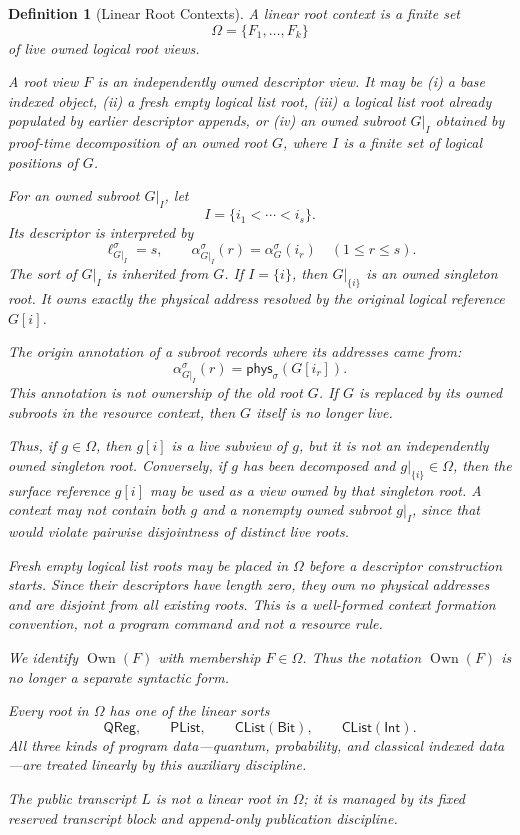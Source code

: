 \documentclass[acmsmall,screen,review,anonymous,nonacm]{acmart}
\newtheorem{definition}{Definition}[section]
\theoremstyle{defn_style}
\begin{document}
\begin{definition}[Linear Root Contexts]
A linear root context is a finite set
\[
\Omega=\{F_1,\ldots,F_k\}
\]
of live owned logical root views.

A root view \(F\) is an independently owned descriptor view. It may be
(i) a base indexed object,
(ii) a fresh empty logical list root,
(iii) a logical list root already populated by earlier descriptor appends, or
(iv) an owned subroot \(G|_I\) obtained by proof-time decomposition of an
owned root \(G\), where \(I\) is a finite set of logical positions of \(G\).

For an owned subroot \(G|_I\), let
\[
I=\{i_1<\cdots<i_s\}.
\]
Its descriptor is interpreted by
\[
\ell_{G|_I}^\sigma=s,
\qquad
\alpha_{G|_I}^\sigma(r)=\alpha_G^\sigma(i_r)
\quad(1\le r\le s).
\]
The sort of \(G|_I\) is inherited from \(G\). If \(I=\{i\}\), then
\(G|_{\{i\}}\) is an owned singleton root. It owns exactly the physical address
resolved by the original logical reference \(G[i]\).

The origin annotation of a subroot records where its addresses came from:
\[
\alpha_{G|_I}^\sigma(r)=\mathsf{phys}_\sigma(G[i_r]).
\]
This annotation is not ownership of the old root \(G\). If \(G\) is replaced by
its owned subroots in the resource context, then \(G\) itself is no longer live.

Thus, if \(g\in\Omega\), then \(g[i]\) is a live subview of \(g\), but it is
not an independently owned singleton root. Conversely, if \(g\) has been
decomposed and \(g|_{\{i\}}\in\Omega\), then the surface reference \(g[i]\)
may be used as a view owned by that singleton root. A context may not contain
both \(g\) and a nonempty owned subroot \(g|_I\), since that would violate
pairwise disjointness of distinct live roots.

Fresh empty logical list roots may be placed in \(\Omega\) before a descriptor
construction starts. Since their descriptors have length zero, they own no
physical addresses and are disjoint from all existing roots. This is a
well-formed context formation convention, not a program command and not a
resource rule.

We identify \(\operatorname{Own}(F)\) with membership \(F\in\Omega\). Thus the
notation \(\operatorname{Own}(F)\) is no longer a separate syntactic form.

Every root in \(\Omega\) has one of the linear sorts
\[
\mathsf{QReg},
\qquad
\mathsf{PList},
\qquad
\mathsf{CList}(\mathsf{Bit}),
\qquad
\mathsf{CList}(\mathsf{Int}).
\]
All three kinds of program data---quantum, probability, and classical indexed
data---are treated linearly by this auxiliary discipline.

The public transcript \(L\) is not a linear root in \(\Omega\); it is managed
by its fixed reserved transcript block and append-only publication discipline.
\end{definition}
\end{document}
